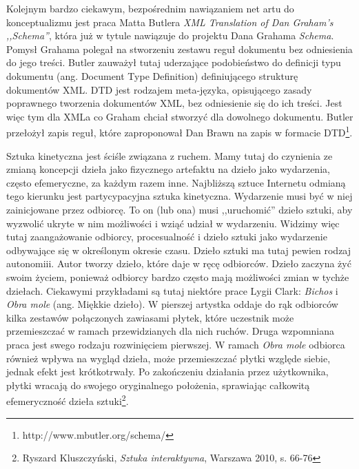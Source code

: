 \documentclass[a4paper,12pt,twoside]{article}
\begin{document}

Kolejnym bardzo ciekawym, bezpośrednim nawiązaniem net artu do konceptualizmu
jest praca Matta Butlera \textit{XML Translation of Dan Graham's ,,Schema''},
która już w tytule nawiązuje do projektu Dana Grahama \textit{Schema}. 
Pomysł Grahama polegał na stworzeniu zestawu reguł dokumentu bez odniesienia
do jego treści. Butler zauważył tutaj uderzające podobieństwo do definicji
typu dokumentu (ang. Document Type Definition) definiującego strukturę
dokumentów XML. DTD jest rodzajem meta-języka, opisującego zasady poprawnego
tworzenia dokumentów XML, bez odniesienie się do ich treści. Jest więc tym
dla XMLa co Graham chciał stworzyć dla dowolnego dokumentu.
Butler przełożył zapis reguł, które zaproponował Dan Brawn na zapis w formacie
DTD\footnote{http://www.mbutler.org/schema/}.

Sztuka kinetyczna jest ściśle związana z ruchem. Mamy tutaj do czynienia
ze zmianą koncepcji dzieła jako fizycznego artefaktu na dzieło
jako wydarzenia, często efemeryczne, za każdym razem inne. Najbliższą sztuce
Internetu odmianą tego kierunku jest partycypacyjna sztuka kinetyczna.
Wydarzenie musi być w niej zainicjowane przez odbiorcę. To on (lub ona)
musi ,,uruchomić'' dzieło sztuki, aby wyzwolić ukryte w nim możliwości
i wziąć udział w wydarzeniu. Widzimy więc tutaj zaangażowanie
odbiorcy, procesualność i dzieło sztuki jako wydarzenie odbywające się
w określonym okresie czasu. Dzieło sztuki ma tutaj pewien rodzaj
autonomiii. Autor tworzy dzieło, które daje w ręcę odbiorców. Dzieło
zaczyna żyć swoim życiem, ponieważ odbiorcy bardzo często mają możliwości
zmian w tychże dziełach. Ciekawymi przykładami są tutaj niektóre prace
Lygii Clark: \textit{Bichos} i \textit{Obra mole} (ang. Miękkie dzieło).
W pierszej artystka oddaje do rąk odbiorców kilka zestawów
połączonych zawiasami płytek, które uczestnik może przemieszczać w ramach
przewidzianych dla nich ruchów. Druga wzpomniana praca jest swego rodzaju
rozwinięciem pierwszej. W ramach \textit{Obra mole} odbiorca również
wpływa na wygląd dzieła, może przemieszczać płytki względe siebie,
jednak efekt jest krótkotrwały. Po zakończeniu działania przez użytkownika,
płytki wracają do swojego oryginalnego położenia, sprawiając całkowitą
efemeryczność dzieła
sztuki\footnote{Ryszard Kluszczyński, \textit{Sztuka interaktywna},
Warszawa 2010, s. 66-76}.
\end{document}
